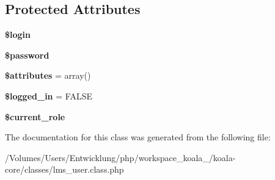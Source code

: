 \subsection*{Protected Attributes}
\begin{DoxyCompactItemize}
\item 
\hypertarget{classlms__user_a3f0223d99229b53a864f282299f6b3d8}{
{\bfseries \$login}}
\label{classlms__user_a3f0223d99229b53a864f282299f6b3d8}

\item 
\hypertarget{classlms__user_afc88e44048c53f7d9c65ff0e3f0c9ea9}{
{\bfseries \$password}}
\label{classlms__user_afc88e44048c53f7d9c65ff0e3f0c9ea9}

\item 
\hypertarget{classlms__user_aae14fe6e834acab730c51084adb34bd0}{
{\bfseries \$attributes} = array()}
\label{classlms__user_aae14fe6e834acab730c51084adb34bd0}

\item 
\hypertarget{classlms__user_a923bfee777a6ea905e0526e4acfc4179}{
{\bfseries \$logged\_\-in} = FALSE}
\label{classlms__user_a923bfee777a6ea905e0526e4acfc4179}

\item 
\hypertarget{classlms__user_ae4a38a2500c5faaf1b07f1df49682a05}{
{\bfseries \$current\_\-role}}
\label{classlms__user_ae4a38a2500c5faaf1b07f1df49682a05}

\end{DoxyCompactItemize}


The documentation for this class was generated from the following file:\begin{DoxyCompactItemize}
\item 
/Volumes/Users/Entwicklung/php/workspace\_\-koala\_/koala-\/core/classes/lms\_\-user.class.php\end{DoxyCompactItemize}
